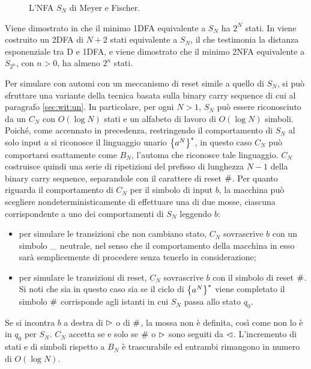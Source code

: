 \begin{figure}
	\centering
	
	\caption{L'NFA $S_N$ di Meyer e Fischer.}
	\label{img:wit:Sn}
\end{figure}

Viene dimostrato in \cite{Meyer:71:ecodescription} che il minimo 1DFA equivalente a $S_N$ ha $2^N$ stati. In \cite{Pighizzini:22:limitedwitness} viene costruito un 2DFA di $N+2$ stati equivalente a $S_N$, il che testimonia la distanza esponenziale tra D e 1DFA, e viene dimostrato che il minimo 2NFA equivalente a $S_{2^n}$, con $n>0$, ha almeno $2^n$ stati.

Per simulare con  automi con un meccanismo di reset simile a quello di $S_N$, si può sfruttare una variante della tecnica basata sulla binary carry sequence di cui al paragrafo \ref{sec:wit:un}. In particolare, per ogni $N>1$, $S_N$ può essere riconosciuto da un  $C_N$ con $O(\log N)$ stati e un alfabeto di lavoro di $O(\log N)$ simboli.
Poiché, come accennato in precedenza, restringendo il comportamento di $S_N$ al solo input $a$ si riconosce il linguaggio unario $\left\{ a^N \right\}^*$, in questo caso $C_N$ può comportarsi esattamente come $B_N$, l'automa che riconosce tale linguaggio. $C_N$ costruisce quindi una serie di ripetizioni del prefisso di lunghezza $N-1$ della binary carry sequence, separandole con il carattere di reset $\#$. Per quanto riguarda il comportamento di $C_N$ per il simbolo di input $b$, la macchina può scegliere nondeterministicamente di effettuare una di due mosse, ciascuna corrispondente a uno dei comportamenti di $S_N$ leggendo $b$:
\begin{itemize}
	\item per simulare le transizioni che non cambiano stato, $C_N$ sovrascrive $b$ con un simbolo $\_$ neutrale, nel senso che il comportamento della macchina in esso sarà semplicemente di procedere senza tenerlo in considerazione;
	\item per simulare le transizioni di reset, $C_N$ sovrascrive $b$ con il simbolo di reset $\#$. Si noti che sia in questo caso sia se il ciclo di $\left\{ a^N \right\}^*$ viene completato il simbolo $\#$ corrisponde agli istanti in cui $S_N$ passa allo stato $q_0$.
\end{itemize}
Se si incontra $b$ a destra di $\rhd$ o di $\#$, la mossa non è definita, così come non lo è in $q_0$ per $S_N$. $C_N$ accetta se e solo se $\#$ o $\rhd$ sono seguiti da $\lhd$. L'incremento di stati e di simboli rispetto a $B_N$ è trascurabile ed entrambi rimangono in numero di $O(\log N)$.

